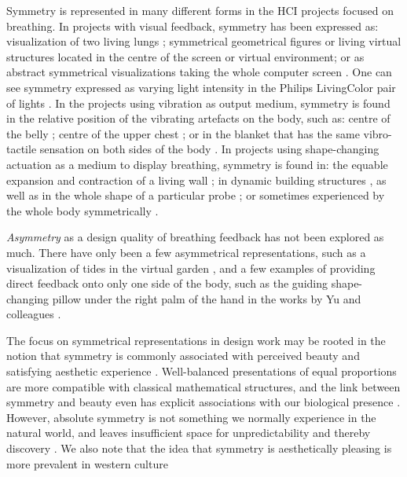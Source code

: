 Symmetry is represented in many different forms in the HCI projects focused on breathing. In  projects with visual feedback, symmetry has been expressed as: visualization of two living lungs \cite{abushakra_augmenting_2014}; symmetrical  geometrical figures \cite{van_rooij_deep_2016, prpa_hacking_2016} or living virtual structures \cite{patibanda_life_2017} located in the centre of the screen or virtual environment; or as abstract symmetrical visualizations taking the whole computer screen \cite{moraveji_breathtray_2012}. One can see symmetry expressed as varying light intensity in the Philips LivingColor pair of lights \cite{dijk_breathe_2011}. In the projects using vibration as output medium, symmetry is found in the relative position of the vibrating artefacts on the body, such as: centre of the belly \cite{bumatay_investigating_2017}; centre of the upper chest \cite{frey_breeze_2018}; or in the blanket that has the same vibro-tactile sensation on both sides of the body \cite{dijk_breathe_2011}. In projects using shape-changing actuation as a medium to display breathing, symmetry is found in: the equable expansion and contraction of a living wall \cite{sjoman_breathing_2018}; in dynamic building structures \cite{moran_exopranayama:_2016, schnadelbach_exobuilding:_2012}, as well as in the whole shape of a particular probe \cite{aslan_hold_2016, kim_breathingframe_2015}; or sometimes experienced by the whole body symmetrically \cite{sun_breath_2017}. 

 \textit{Asymmetry} as a design quality of breathing feedback has not been explored as much. There have only been a few asymmetrical representations, such as a visualization of tides in the virtual garden \cite{roo_inner_2017}, and a few examples of providing direct feedback onto only one side of the body, such as the guiding shape-changing pillow under the right palm of the hand in the works by Yu and colleagues \cite{yu_breathe_2015}.

The focus on symmetrical representations in design work may be rooted in the notion that symmetry is commonly associated with perceived beauty and satisfying aesthetic experience \cite{nadal_study_2020, mcmanus_symmetry_2005}. Well-balanced presentations of equal proportions are more compatible with classical mathematical structures, and the link between symmetry and beauty even has explicit associations with our biological presence \cite{cardenas_symmetrical_2006}. However, absolute symmetry is not something we normally experience in the natural world, and leaves insufficient space for unpredictability and thereby discovery \cite{mcmanus_symmetry_2005}. We also note that the idea that symmetry is aesthetically pleasing is more prevalent in western culture \cite{nadal_study_2020, zeki_clive_2013}

